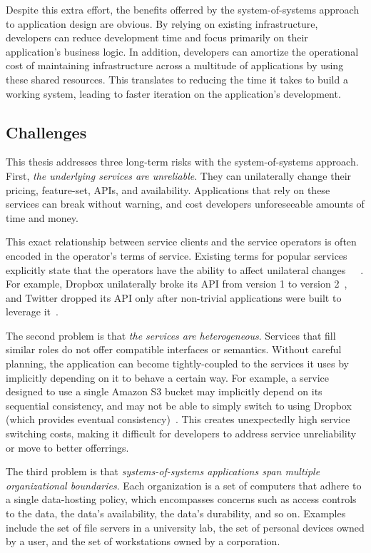 Despite this extra effort, the benefits offerred by the system-of-systems
approach to application design are obvious.  By relying on existing infrastructure,
developers can reduce development time and focus primarily on their application's business
logic.  In addition, developers can amortize the operational cost of
maintaining infrastructure across a multitude of applications by using these
shared resources.  This translates to reducing the time it takes to build a
working system, leading to faster iteration on the application's development.

\subsection{Challenges}

This thesis addresses three long-term risks with the system-of-systems approach.
First, \emph{the underlying services are unreliable}.  They can unilaterally
change their pricing, feature-set, APIs, and availability.
Applications that rely on these services can break without warning,
and cost developers unforeseeable amounts of time and money.

This exact relationship between service clients and the service operators is often encoded
in the operator's terms of service.  Existing terms for popular services
explicitly state that the operators have the ability to affect unilateral
changes~\cite{amazon-tos}~\cite{google-tos}~\cite{dropbox-tos}.  For example,
Dropbox unilaterally broke its API from version 1 to version
2~\cite{dropbox-v2-api-psa}, and Twitter dropped its API only after non-trivial
applications were built to leverage it~\cite{twitter-api-deprecation-psa}.

The second problem is that \emph{the services are heterogeneous}.  Services that fill similar roles
do not offer compatible interfaces or semantics.
Without careful planning, the application can become tightly-coupled to the
services it uses by implicitly depending on it to behave a certain way.  For
example, a service designed to use a single Amazon S3 bucket may implicitly
depend on its sequential consistency, and may not be able to simply switch to
using Dropbox (which provides eventual
consistency)~\cite{consistency-comparison-cloud-storage}.
This creates unexpectedly high service switching costs, making it
difficult for developers to address service unreliability or move to better
offerrings.

The third problem is that \emph{systems-of-systems applications span multiple
organizational boundaries}.  Each organization is a set of computers that
adhere to a single data-hosting policy, which encompasses concerns such as
access controls to the data, the data's availability, the data's durability, and
so on.  Examples include the set of file servers in a university lab,
the set of personal devices owned by a user, and the set of workstations owned by a
corporation.

